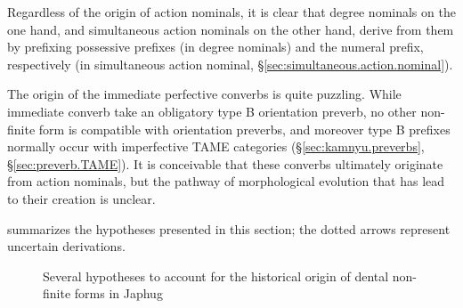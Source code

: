 Regardless of the origin of action nominals, it is clear that degree nominals on the one hand, and simultaneous action nominals on the other hand, derive from them by prefixing possessive prefixes (in degree nominals) and the numeral  prefix, respectively (in simultaneous action nominal, §\ref{sec:simultaneous.action.nominal}).

The origin of the immediate perfective converbs is quite puzzling. While immediate converb take an obligatory type B orientation preverb, no other  non-finite form is compatible with orientation preverbs, and moreover type B prefixes normally occur with imperfective TAME categories (§\ref{sec:kamnyu.preverbs}, §\ref{sec:preverb.TAME}). It is conceivable that these converbs ultimately originate from action nominals, but the pathway of morphological evolution that has lead to their creation is unclear.

 summarizes the hypotheses presented in this section; the dotted arrows represent uncertain derivations.

   \begin{figure}[H]
   \caption{Several hypotheses to account for the historical origin of dental non-finite forms in Japhug} \label{fig:dental.nmlz.history}  
\end{figure}


